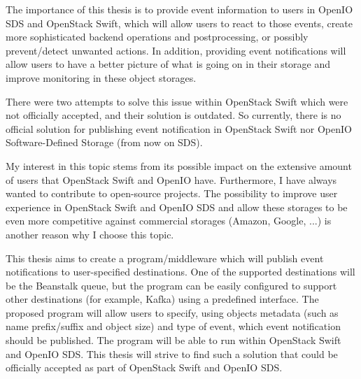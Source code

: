 The importance of this thesis is to provide event information to users in OpenIO SDS and OpenStack Swift, which will allow users to react to those events, create more sophisticated backend operations and postprocessing, or possibly prevent/detect unwanted actions. In addition, providing event notifications will allow users to have a better picture of what is going on in their storage and improve monitoring in these object storages.

There were two attempts\cite{swiftPatch1}\cite{swiftPatch2} to solve this issue within OpenStack Swift which were not officially accepted, and their solution is outdated. So currently, there is no official solution for publishing event notification in OpenStack Swift nor OpenIO Software-Defined Storage (from now on SDS).

My interest in this topic stems from its possible impact on the extensive amount of users that OpenStack Swift and OpenIO have. Furthermore, I have always wanted to contribute to open-source projects. The possibility to improve user experience in OpenStack Swift and OpenIO SDS and allow these storages to be even more competitive against commercial storages (Amazon, Google, ...) is another reason why I choose this topic.

This thesis aims to create a program/middleware which will publish event notifications to user-specified destinations. One of the supported destinations will be the Beanstalk queue, but the program can be easily configured to support other destinations (for example, Kafka) using a predefined interface. The proposed program will allow users to specify, using objects metadata (such as name prefix/suffix and object size) and type of event, which event notification should be published. The program will be able to run within OpenStack Swift and OpenIO SDS. This thesis will strive to find such a solution that could be officially accepted as part of OpenStack Swift and OpenIO SDS.

